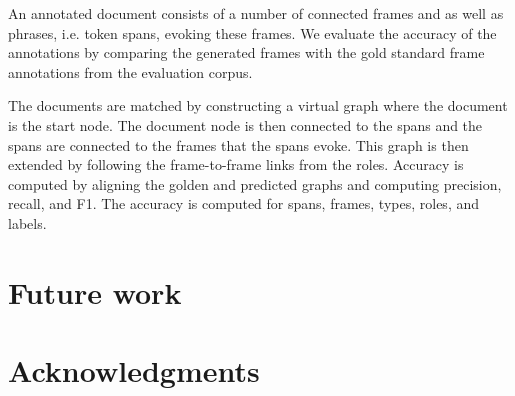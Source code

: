 \documentclass[11pt,a4paper]{article}
\begin{document}
An annotated document consists of a number of connected frames and as well as
phrases, i.e. token spans, evoking these frames. We evaluate the accuracy of the
annotations by comparing the generated frames with the gold standard frame
annotations from the evaluation corpus.

The documents are matched by constructing a virtual graph where the document
is the start node. The document node is then connected to the spans and the
spans are connected to the frames that the spans evoke. This graph is then
extended by following the frame-to-frame links from the roles. Accuracy is
computed by aligning the golden and predicted graphs and computing precision,
recall, and F1. The accuracy is computed for spans, frames, types, roles, and
labels.

\section{Future work}



\section{Acknowledgments}



\end{document}
